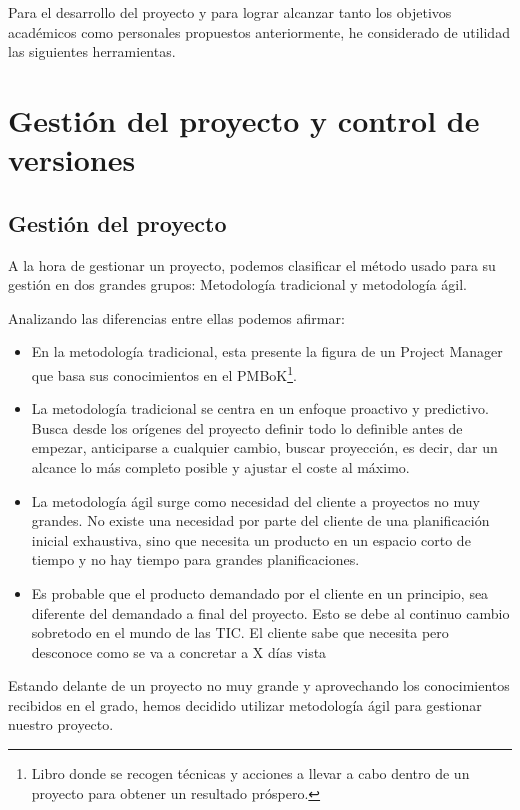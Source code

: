 
Para el desarrollo del proyecto y para lograr alcanzar tanto los objetivos académicos como personales propuestos anteriormente, he considerado de utilidad las siguientes herramientas.

\section{Gestión del proyecto y control de versiones}

\subsection{Gestión del proyecto}

A la hora de gestionar un proyecto, podemos clasificar el método usado para su gestión en dos grandes grupos: Metodología tradicional y metodología ágil.

Analizando las diferencias entre ellas podemos afirmar:

\begin{itemize}
	\item En la metodología tradicional, esta presente la figura de un Project Manager que basa sus conocimientos en el PMBoK\footnote{Libro donde se recogen técnicas y acciones a llevar a cabo dentro de un proyecto para obtener un resultado próspero.}.
	\item La metodología tradicional se centra en un enfoque proactivo y predictivo. Busca desde los orígenes del proyecto definir todo lo definible antes de empezar, anticiparse a cualquier cambio, buscar proyección, es decir, dar un alcance lo más completo posible y ajustar el coste al máximo.
	
	\item La metodología ágil surge como necesidad del cliente a proyectos no muy grandes. No existe una necesidad por parte del cliente de una planificación inicial exhaustiva, sino que necesita un producto en un espacio corto de tiempo y no hay tiempo para grandes planificaciones.
	\item Es probable que el producto demandado por el cliente en un principio, sea diferente del demandado a final del proyecto. Esto se debe al continuo cambio sobretodo en el mundo de las TIC. El cliente sabe que necesita pero desconoce como se va a concretar a X días vista
\end{itemize}

Estando delante de un proyecto no muy grande y aprovechando los conocimientos recibidos en el grado, hemos decidido utilizar metodología ágil para gestionar nuestro proyecto.

